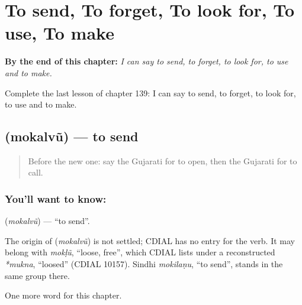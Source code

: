 
\chapter{To send, To forget, To look for, To use, To make}
\label{ch:gu-to-send-to-forget-to-look-for-to-use-to-make}

\begin{chapteropening}
\textbf{By the end of this chapter:} \emph{I can say to send, to forget, to look for, to use and to make.}

Complete the last lesson of chapter 139: I can say to send, to forget, to look for, to use and to make.
\end{chapteropening}

\section[\texorpdfstring{\gu{મોકલવું} (mokalvũ)}{મોકલવું (mokalvũ)}]{ (mokalvũ) — to send}

\label{lesson:GU-C139-mokalvu}



\begin{quote}
Before the new one: say the Gujarati for to open, then the Gujarati for to call.
\end{quote}

\subsection*{You'll want to know: }
\textbf{} (\emph{mokalvũ}) — \textquotedblleft{}to send\textquotedblright{}.

\begin{cousinweb}
The origin of \textbf{} (\emph{mokalvũ}) is not settled; CDIAL has no entry for the verb. It may belong with \emph{mokḷũ}, \textquotedblleft{}loose, free\textquotedblright{}, which CDIAL lists under a reconstructed \emph{*mukna}, \textquotedblleft{}loosed\textquotedblright{} (CDIAL 10157). Sindhi \emph{mokilaṇu}, \textquotedblleft{}to send\textquotedblright{}, stands in the same group there.
\end{cousinweb}

\begin{grammarlens}[title={What you've built}]
One more word for this chapter.
\end{grammarlens}

